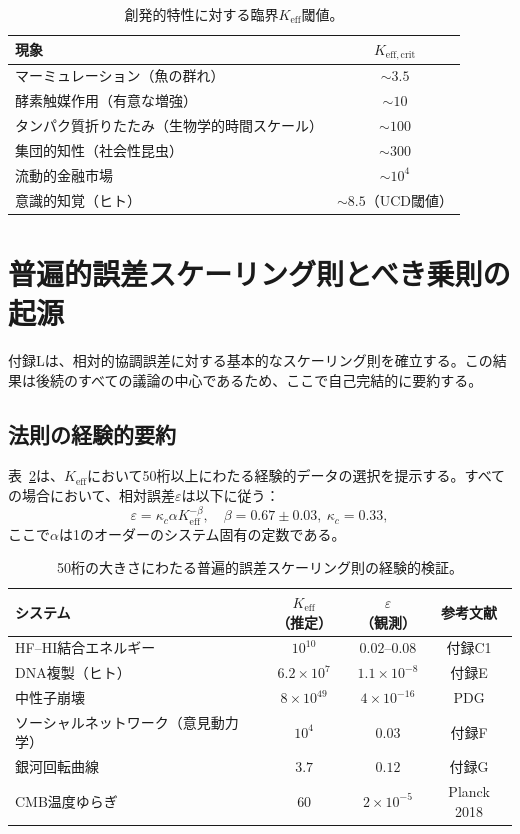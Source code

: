 \documentclass[11pt,a4paper]{article}
\theoremstyle{remark}
\newcommand{\Keff}{K_{\mathrm{eff}}}
\newcommand{\Keffcrit}{K_{\mathrm{eff},\text{crit}}}
\begin{document}
	\begin{table}[H]
		\centering
		\caption{創発的特性に対する臨界\(\Keff\)閾値。}
		\label{tab:thresholds}
		\begin{tabular}{l c}
			\toprule
			\textbf{現象} & \(\Keffcrit\) \\
			\midrule
			マーミュレーション（魚の群れ） & \(\sim 3.5\) \\
			酵素触媒作用（有意な増強） & \(\sim 10\) \\
			タンパク質折りたたみ（生物学的時間スケール） & \(\sim 100\) \\
			集団的知性（社会性昆虫） & \(\sim 300\) \\
			流動的金融市場 & \(\sim 10^4\) \\
			意識的知覚（ヒト） & \(\sim 8.5\)（UCD閾値） \\
			\bottomrule
		\end{tabular}
	\end{table}
	
	\section{普遍的誤差スケーリング則とべき乗則の起源}
	\label{sec:scaling}
	
	付録Lは、相対的協調誤差に対する基本的なスケーリング則を確立する。この結果は後続のすべての議論の中心であるため、ここで自己完結的に要約する。
	
	\subsection{法則の経験的要約}
	
	表~\ref{tab:scaling_data}は、\(\Keff\)において50桁以上にわたる経験的データの選択を提示する。すべての場合において、相対誤差\(\varepsilon\)は以下に従う：
	\begin{equation}
		\varepsilon = \kappa_c \alpha \Keff^{-\beta}, \quad \beta = 0.67 \pm 0.03,\ \kappa_c = 0.33,
		\label{eq:error-scaling}
	\end{equation}
	ここで\(\alpha\)は1のオーダーのシステム固有の定数である。
	
	\begin{table}[H]
		\centering
		\caption{50桁の大きさにわたる普遍的誤差スケーリング則の経験的検証。}
		\label{tab:scaling_data}
		\begin{tabular}{l c c c}
			\toprule
			\textbf{システム} & \(\Keff\)（推定） & \(\varepsilon\)（観測） & 参考文献 \\
			\midrule
			HF–HI結合エネルギー & \(10^{10}\) & \(0.02\)--\(0.08\) & 付録C1 \\
			DNA複製（ヒト） & \(6.2\times10^7\) & \(1.1\times10^{-8}\) & 付録E \\
			中性子崩壊 & \(8\times10^{49}\) & \(4\times10^{-16}\) & PDG \\
			ソーシャルネットワーク（意見動力学） & \(10^4\) & \(0.03\) & 付録F \\
			銀河回転曲線 & \(3.7\) & \(0.12\) & 付録G \\
			CMB温度ゆらぎ & \(60\) & \(2\times10^{-5}\) & Planck 2018 \\
			\bottomrule
		\end{tabular}
	\end{table}
	
\end{document}
